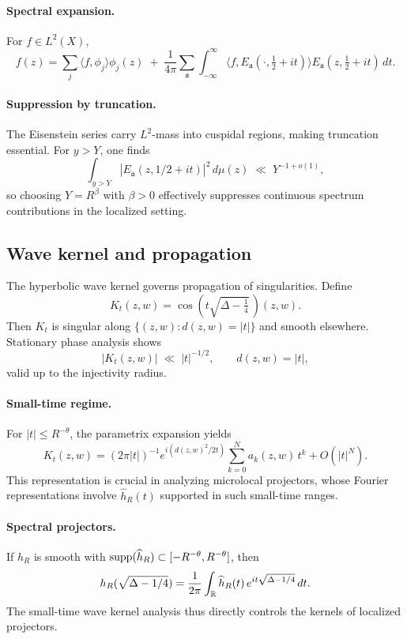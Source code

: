 \paragraph{Spectral expansion.}
For $f\in L^2(X)$,
\[
f(z) = \sum_j \langle f,\phi_j\rangle \phi_j(z) \;+\; \frac{1}{4\pi}\sum_{\mathfrak{a}} \int_{-\infty}^\infty \langle f, E_\mathfrak{a}(\cdot,\tfrac12+it)\rangle E_\mathfrak{a}(z,\tfrac12+it)\,dt.
\]

\paragraph{Suppression by truncation.}
The Eisenstein series carry $L^2$-mass into cuspidal regions, making truncation essential. For $y>Y$, one finds
\[
\int_{y>Y} |E_\mathfrak{a}(z,1/2+it)|^2\, d\mu(z) \;\ll\; Y^{-1+o(1)},
\]
so choosing $Y=R^\beta$ with $\beta>0$ effectively suppresses continuous spectrum contributions in the localized setting.

\subsection{Wave kernel and propagation}\label{subsec:wave}

The hyperbolic wave kernel governs propagation of singularities. Define
\[
K_t(z,w) = \cos\!\left(t\sqrt{\Delta-\tfrac14}\,\right)(z,w).
\]
Then $K_t$ is singular along $\{(z,w): d(z,w)=|t|\}$ and smooth elsewhere. Stationary phase analysis shows
\[
|K_t(z,w)| \;\ll\; |t|^{-1/2},\qquad d(z,w)=|t|,
\]
valid up to the injectivity radius. 

\paragraph{Small-time regime.}
For $|t|\le R^{-\theta}$, the parametrix expansion yields
\[
K_t(z,w) = (2\pi|t|)^{-1} e^{i(d(z,w)^2/2t)}\sum_{k=0}^N a_k(z,w)\, t^k + O(|t|^N).
\]
This representation is crucial in analyzing microlocal projectors, whose Fourier representations involve $\widehat{h}_R(t)$ supported in such small-time ranges.

\paragraph{Spectral projectors.}
If $h_R$ is smooth with $\operatorname{supp}(\widehat{h}_R)\subset [-R^{-\theta},R^{-\theta}]$, then
\[
h_R(\sqrt{\Delta-1/4}) = \frac{1}{2\pi}\int_{\mathbb{R}} \widehat{h}_R(t)\, e^{it\sqrt{\Delta-1/4}}\,dt.
\]
The small-time wave kernel analysis thus directly controls the kernels of localized projectors.

